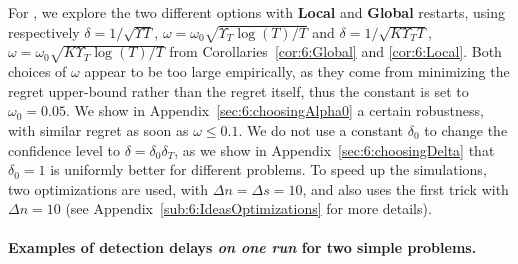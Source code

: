 
For \GLRklUCB, we explore the two different options with \textbf{Local} and \textbf{Global} restarts,
using respectively
$\delta = 1/\sqrt{\Upsilon T}$, $\omega = \omega_0 \sqrt{\Upsilon_T \log(T) /T}$
and
$\delta = 1/\sqrt{K \Upsilon_T T}$, $\omega = \omega_0\sqrt{K \Upsilon_T \log(T) / T}$
from Corollaries~\ref{cor:6:Global} and \ref{cor:6:Local}.
Both choices of $\omega$ appear to be too large empirically, as they come from minimizing the regret upper-bound rather than the regret itself, thus
the constant is set to $\omega_0 = 0.05$.
We show in Appendix~\ref{sec:6:choosingAlpha0} a certain robustness, with similar regret as soon as $\omega\leq0.1$.
We do not use a constant $\delta_0$ to change the confidence level to $\delta = \delta_0 \delta_T$, as we show in Appendix~\ref{sec:6:choosingDelta} that $\delta_0=1$ is uniformly better for different problems.
%
To speed up the simulations, two optimizations are used, with $\Delta n = \Delta s = 10$,
and \CUSUM{} also uses the first trick with $\Delta n = 10$ (see Appendix~\ref{sub:6:IdeasOptimizations} for more details).

%


\paragraph{Examples of detection delays \emph{on one run} for two simple problems.}

